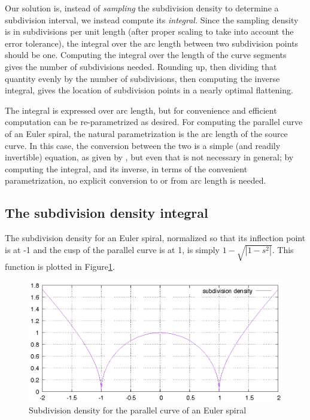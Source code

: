 \documentclass[format=acmsmall]{acmart}
\begin{document}
Our solution is, instead of \emph{sampling} the subdivision density to determine a subdivision interval, we instead compute its \emph{integral.} Since the sampling density is in subdivisions per unit length (after proper scaling to take into account the error tolerance), the integral over the arc length between two subdivision points should be one. Computing the integral over the length of the curve segments gives the number of subdivisions needed. Rounding up, then dividing that quantity evenly by the number of subdivisions, then computing the inverse integral, gives the location of subdivision points in a nearly optimal flattening.

The integral is expressed over arc length, but for convenience and efficient computation can be re-parametrized as desired. For computing the parallel curve of an Euler spiral, the natural parametrization is the arc length of the source curve. In this case, the conversion between the two is a simple (and readily invertible) equation, as given by \cite{Wieleitner1907}, but even that is not necessary in general; by computing the integral, and its inverse, in terms of the convenient parametrization, no explicit conversion to or from arc length is needed.

\subsection{The subdivision density integral}

The subdivision density for an Euler spiral, normalized so that its inflection point is at -1 and the cusp of the parallel curve is at 1, is simply $1 - \sqrt{|1-s^2|}$. This function is plotted in Figure\ref{fig:subdiv_density}.

\begin{figure}
    \includegraphics{subdiv_density}
    \caption{Subdivision density for the parallel curve of an Euler spiral}
    \label{fig:subdiv_density}
\end{figure}
\end{document}
